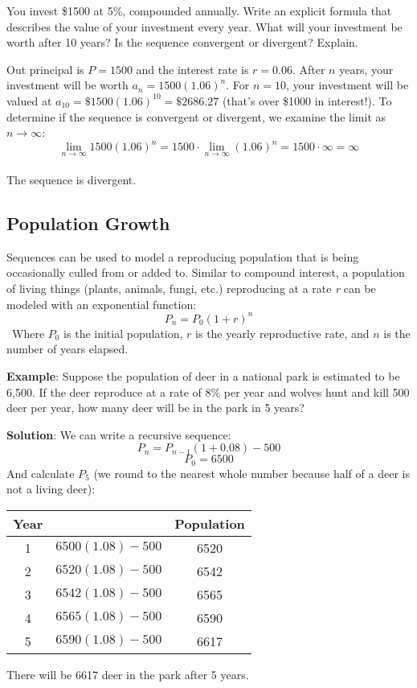 \begin{Exercise}[label=seqcalc5]
You invest \$1500 at 5\%, compounded annually. Write an explicit formula that 
describes the value of your investment every year. What will your investment 
be worth after 10 years? Is the sequence convergent or divergent? Explain. 
\end{Exercise}

\begin{Answer}[ref=seqcalc5]
Out principal is $P = 1500$ and the interest rate is $r = 0.06$. After $n$ 
years, your investment will be worth $a_n = 1500(1.06)^{n}$. For $n = 10$, 
your investment will be valued at $a_{10} = \$1500(1.06)^{10} = \$2686.27$ 
(that's over \$1000 in interest!). To determine if the sequence is convergent 
or divergent, we examine the limit as $n \to \infty$:
$$\lim_{n \to \infty} 1500(1.06)^n = 1500\cdot \lim_{n \to \infty}
(1.06)^n = 1500 \cdot \infty = \infty$$\\
The sequence is divergent. 
\end{Answer}

\subsection{Population Growth}
Sequences can be used to model a reproducing population that is being 
occasionally culled from or added to. Similar to compound interest, a 
population of living things (plants, animals, fungi, etc.) reproducing at a 
rate \textit{r} can be modeled with an exponential function:
$$P_n = P_0(1+r)^n$$\
Where $P_0$ is the initial population, $r$ is the yearly reproductive rate, 
and $n$ is the number of years elapsed. 

\textbf{Example}: Suppose the population of deer in a national park is 
estimated to be 6,500. If the deer reproduce at a rate of 8\% per year and 
wolves hunt and kill 500 deer per year, how many deer will be in the park in 5 
years? 

\textbf{Solution}: We can write a recursive sequence:
$$P_n = P_{n-1}(1 + 0.08) - 500$$
$$P_0 = 6500$$
And calculate $P_5$ (we round to the nearest whole number because half of a 
deer is not a living deer):
\begin{center}
\begin{tabular}{|c|c|c|}\hline
Year & & Population\\
\hline
1 & $6500(1.08) - 500$ & 6520\\
\hline
2 & $6520(1.08) - 500$ & 6542\\
\hline
3 & $6542(1.08) - 500$ & 6565\\
\hline
4 & $6565(1.08) - 500$ & 6590\\
\hline
5 & $6590(1.08) - 500$ & 6617\\
\hline
\end{tabular}
\end{center}
There will be 6617 deer in the park after 5 years. 

